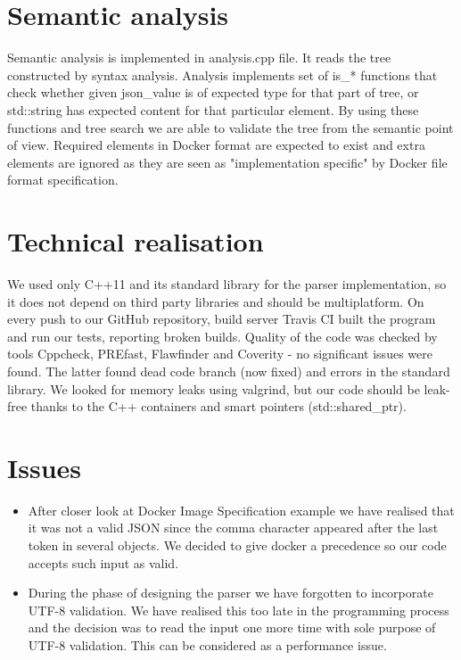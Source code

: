 \documentclass[paper=a4, fontsize=11pt, abstract=on]{scrartcl} %
\numberwithin{equation}{section} %
\numberwithin{figure}{section} %
\numberwithin{table}{section} %
\begin{document}
\section{Semantic analysis}

Semantic analysis is implemented in analysis.cpp file. It reads the tree constructed by syntax analysis. Analysis implements set of is\_* functions that check whether given json\_value is of expected type for that part of tree, or std::string has expected content for that particular element. By using these functions and tree search we are able to validate the tree from the semantic point of view. Required elements in Docker format are expected to exist and extra elements are ignored as they are seen as "implementation specific" by Docker file format specification.


\section{Technical realisation}
We used only C++11 and its standard library for the parser implementation, so it does not
depend on third party libraries and should be multiplatform. On every push to our GitHub
repository, build server Travis CI built the program and run our tests, reporting broken builds.
Quality of the code was checked by tools Cppcheck, PREfast, Flawfinder and Coverity - no significant
issues were found. The latter found dead code branch (now fixed) and errors in the standard library.
We looked for memory leaks using valgrind, but our code should be leak-free thanks to the C++ containers
and smart pointers (std::shared\_ptr).

\section{Issues}
\begin{itemize}

    \item After closer look at Docker Image Specification example we have
        realised that it was not a valid JSON since the comma character
        appeared after the last token in several objects. We decided to give
        docker a precedence so our code accepts such input as valid.

    \item During the phase of designing the parser we have forgotten to
        incorporate UTF-8 validation. We have realised this too late in the
        programming process and the decision was to read the input one more time
        with sole purpose of UTF-8 validation. This can be considered as a
        performance issue.

\end{itemize}
\end{document}
